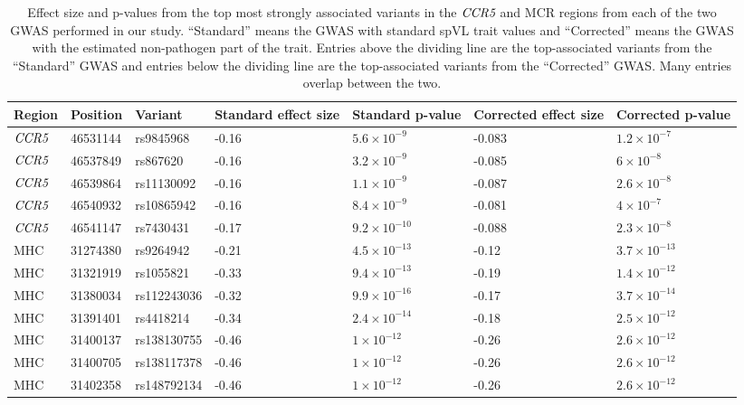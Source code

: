 \documentclass[11pt]{article}
\begin{document}
\begin{table}[ht]
\caption{Effect size and p-values from the top most strongly associated variants in the $\emph{CCR5}$ and MCR regions from each of the two GWAS performed in our study. ``Standard'' means the GWAS with standard spVL trait values and ``Corrected'' means the GWAS with the estimated non-pathogen part of the trait. Entries above the dividing line are the top-associated variants from the ``Standard'' GWAS and entries below the dividing line are the top-associated variants from the ``Corrected'' GWAS. Many entries overlap between the two.}
\begin{tabularx}{\linewidth}{XXXXXXX}
  \hline
    Region & Position & Variant & Standard effect size & Standard p-value & Corrected effect size & Corrected p-value \\ 
  \hline
    $\emph{CCR5}$ & 46531144 & rs9845968 & -0.16 & $5.6 \times 10^{-9}$ & -0.083 & $1.2 \times 10^{-7}$ \\ 
    $\emph{CCR5}$ & 46537849 & rs867620 & -0.16 & $3.2 \times 10^{-9}$ & -0.085 & $6 \times 10^{-8}$ \\ 
    $\emph{CCR5}$ & 46539864 & rs11130092 & -0.16 & $1.1 \times 10^{-9}$ & -0.087 & $2.6 \times 10^{-8}$ \\ 
    $\emph{CCR5}$ & 46540932 & rs10865942 & -0.16 & $8.4 \times 10^{-9}$ & -0.081 & $4 \times 10^{-7}$ \\ 
    $\emph{CCR5}$ & 46541147 & rs7430431 & -0.17 & $9.2 \times 10^{-10}$ & -0.088 & $2.3 \times 10^{-8}$ \\ 
    MHC & 31274380 & rs9264942 & -0.21 & $4.5 \times 10^{-13}$ & -0.12 & $3.7 \times 10^{-13}$ \\ 
    MHC & 31321919 & rs1055821 & -0.33 & $9.4 \times 10^{-13}$ & -0.19 & $1.4 \times 10^{-12}$ \\ 
    MHC & 31380034 & rs112243036 & -0.32 & $9.9 \times 10^{-16}$ & -0.17 & $3.7 \times 10^{-14}$ \\ 
    MHC & 31391401 & rs4418214 & -0.34 & $2.4 \times 10^{-14}$ & -0.18 & $2.5 \times 10^{-12}$ \\ 
    MHC & 31400137 & rs138130755 & -0.46 & $1 \times 10^{-12}$ & -0.26 & $2.6 \times 10^{-12}$ \\ 
    MHC & 31400705 & rs138117378 & -0.46 & $1 \times 10^{-12}$ & -0.26 & $2.6 \times 10^{-12}$ \\ 
    MHC & 31402358 & rs148792134 & -0.46 & $1 \times 10^{-12}$ & -0.26 & $2.6 \times 10^{-12}$ \\ 

\end{tabularx}
\end{table}
\end{document}
